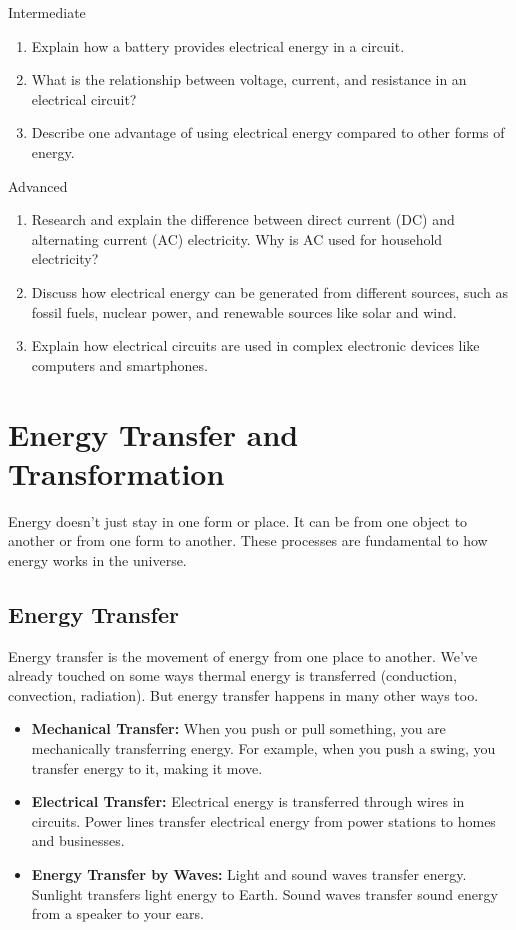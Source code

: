 \begin{tieredquestions}{Intermediate}
\begin{enumerate}
    \item Explain how a battery provides electrical energy in a circuit.
    \item What is the relationship between voltage, current, and resistance in an electrical circuit?
    \item Describe one advantage of using electrical energy compared to other forms of energy.
\end{enumerate}
\end{tieredquestions}

\begin{tieredquestions}{Advanced}
\begin{enumerate}
    \item Research and explain the difference between direct current (DC) and alternating current (AC) electricity.  Why is AC used for household electricity?
    \item Discuss how electrical energy can be generated from different sources, such as fossil fuels, nuclear power, and renewable sources like solar and wind.
    \item Explain how electrical circuits are used in complex electronic devices like computers and smartphones.
\end{enumerate}
\end{tieredquestions}


\section{Energy Transfer and Transformation}

Energy doesn't just stay in one form or place. It can be  from one object to another or  from one form to another.  These processes are fundamental to how energy works in the universe.

\subsection{Energy Transfer}

Energy transfer is the movement of energy from one place to another. We've already touched on some ways thermal energy is transferred (conduction, convection, radiation).  But energy transfer happens in many other ways too.

\begin{itemize}
    \item \textbf{Mechanical Transfer:}  When you push or pull something, you are mechanically transferring energy.  For example, when you push a swing, you transfer energy to it, making it move.
    \item \textbf{Electrical Transfer:}  Electrical energy is transferred through wires in circuits.  Power lines transfer electrical energy from power stations to homes and businesses.
    \item \textbf{Energy Transfer by Waves:} Light and sound waves transfer energy.  Sunlight transfers light energy to Earth.  Sound waves transfer sound energy from a speaker to your ears.
\end{itemize}

